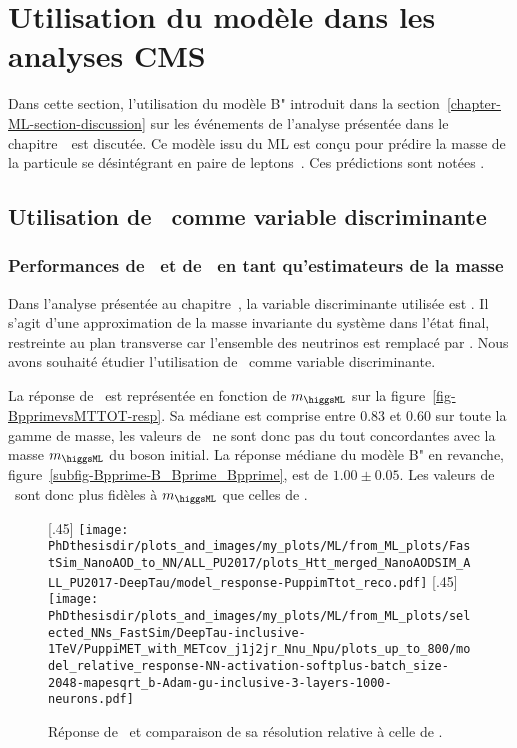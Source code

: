 \section{Utilisation du modèle dans les analyses CMS}\label{chapter-ML-section-use_HTT}
Dans cette section, l'utilisation du modèle B" introduit dans la section~\ref{chapter-ML-section-discussion} sur les événements de l'analyse présentée dans le chapitre~\ est discutée.
Ce modèle issu du ML est conçu pour prédire la masse de la particule se désintégrant en paire de leptons~\tau.
Ces prédictions sont notées \mml.
\subsection{Utilisation de \mml\ comme variable discriminante}
\subsubsection{Performances de \mml\ et de \mTtot\ en tant qu'estimateurs de la masse}
Dans l'analyse présentée au chapitre~,
la variable discriminante utilisée est \mTtot.
Il s'agit d'une approximation de la masse invariante du système dans l'état final,
restreinte au plan transverse car l'ensemble des neutrinos est remplacé par \MET.
Nous avons souhaité étudier l'utilisation de \mml\ comme variable discriminante.
\par
La réponse de \mTtot\ est représentée en fonction de $m_{\higgsML}$ sur la figure~\ref{fig-BpprimevsMTTOT-resp}.
Sa médiane est comprise entre \num{0.83} et \num{0.60} sur toute la gamme de masse,
les valeurs de \mTtot\ ne sont donc pas du tout concordantes avec la masse $m_{\higgsML}$ du boson initial.
La réponse médiane du modèle B" en revanche, figure~\ref{subfig-Bpprime-B_Bprime_Bpprime}, est de $\num{1.00}\pm\num{0.05}$.
Les valeurs de \mml\ sont donc plus fidèles à $m_{\higgsML}$ que celles de \mTtot.
\begin{figure}[h]
\centering

[.45\textwidth]
{\texttt{[image: \\PhDthesisdir/plots\_and\_images/my\_plots/ML/from\_ML\_plots/FastSim\_NanoAOD\_to\_NN/ALL\_PU2017/plots\_Htt\_merged\_NanoAODSIM\_ALL\_PU2017-DeepTau/model\_response-PuppimTtot\_reco.pdf]}\vspace{-.5\baselineskip}}
\hfill
{}[.45\textwidth]
{\texttt{[image: \\PhDthesisdir/plots\_and\_images/my\_plots/ML/from\_ML\_plots/selected\_NNs\_FastSim/DeepTau-inclusive-1TeV/PuppiMET\_with\_METcov\_j1j2jr\_Nnu\_Npu/plots\_up\_to\_800/model\_relative\_response-NN-activation-softplus-batch\_size-2048-mapesqrt\_b-Adam-gu-inclusive-3-layers-1000-neurons.pdf]}\vspace{-.5\baselineskip}}

\caption{Réponse de \mTtot\ et comparaison de sa résolution relative à celle de \mml.}
\label{fig-BpprimevsMTTOT}
\end{figure}
